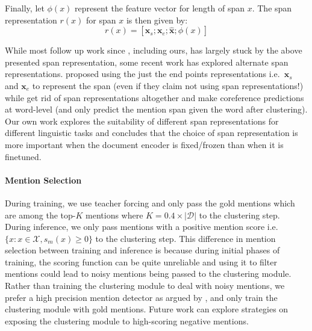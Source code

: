 \documentclass[12pt]{thesis-umich}[thesis]
\def\vec#1{\ensuremath{\boldsymbol{{#1}}}}
\begin{document}
Finally, let $\phi(x)$ represent the feature vector for length of span $x$. The span representation $r(x)$ for span $x$ is then given by:
$$r(x) = [\vec{x}_s; \vec{x}_e; \hat{\vec{x}}; \phi(x)]$$

While most follow up work since \citet{lee-etal-2017-end}, including ours, has largely stuck by the above presented span representation, some recent work has explored alternate span representations. \citet{kirstain-etal-2021-coreference} proposed using the just the end points representations i.e.\ $\vec{x}_s$ and $\vec{x}_e$ to represent the span (even if they claim not using span representations!) while \citet{dobrovolskii-2021-word} get rid of span representations altogether and make coreference predictions at word-level (and only predict the mention span given the word after clustering). Our own work  \citet{toshniwal2020cross} explores the suitability of different span representations for different linguistic tasks and concludes that the choice of span representation is more important when the document encoder is fixed/frozen than when it is finetuned.        


\paragraph{Mention Selection} During training, we use teacher forcing and only pass the gold mentions which are among the top-$K$ mentions where $K = 0.4 \times |\mathcal{D}|$ to the clustering step.
During inference, we only pass mentions with a positive mention score i.e. $\{x: x \in \mathcal{X}, s_m(x) \geq 0\}$ to the clustering step.
This difference in mention selection between training and inference is because during initial phases of training, the scoring function can be quite unreliable and using it to filter mentions could lead to noisy mentions being passed to the clustering module. Rather than training the clustering module to deal with noisy mentions, we prefer a high precision mention detector as argued by \citet{wu2020understanding}, and only train the clustering module with gold mentions. Future work can explore strategies on exposing the clustering module to high-scoring negative mentions.
\end{document}
